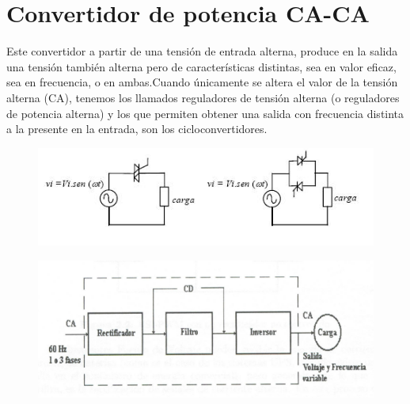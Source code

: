 \documentclass[11pt]{article}
\begin{document}
\section{Convertidor de potencia CA-CA}
Este convertidor a partir de una tensi\'on de entrada alterna, produce en la salida una tensi\'on tambi\'en alterna pero de caracter\'isticas distintas, sea en valor eficaz, sea en frecuencia, o en ambas.Cuando \'unicamente se altera el valor de la tensi\'on alterna (CA), tenemos los llamados reguladores de tensi\'on alterna (o reguladores de potencia alterna) y los que permiten obtener una salida con frecuencia distinta a la presente en la entrada, son los cicloconvertidores.\\
\begin{figure}[htp]
\centering
\includegraphics[scale=2.60]{circuito.jpg}
\caption{}
\label{}
\end{figure}
\begin{figure}[htp]
\centering
\includegraphics[scale=.10]{CA-CA.png}
\caption{}
\label{}
\end{figure}
\end{document}

